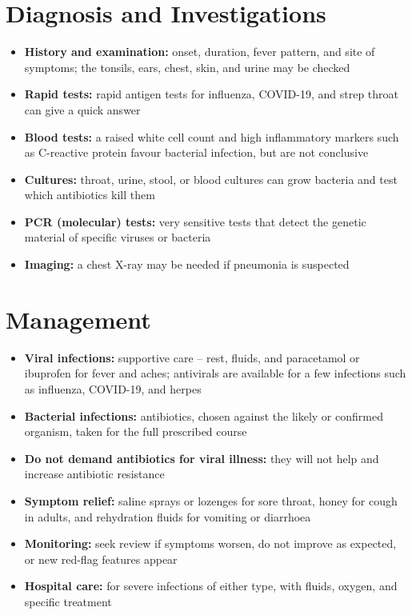 \section*{Diagnosis and Investigations}
\begin{itemize}
    \item \textbf{History and examination:} onset, duration, fever pattern, and site of symptoms; the tonsils, ears, chest, skin, and urine may be checked
    \item \textbf{Rapid tests:} rapid antigen tests for influenza, COVID-19, and strep throat can give a quick answer
    \item \textbf{Blood tests:} a raised white cell count and high inflammatory markers such as C-reactive protein favour bacterial infection, but are not conclusive
    \item \textbf{Cultures:} throat, urine, stool, or blood cultures can grow bacteria and test which antibiotics kill them
    \item \textbf{PCR (molecular) tests:} very sensitive tests that detect the genetic material of specific viruses or bacteria
    \item \textbf{Imaging:} a chest X-ray may be needed if pneumonia is suspected
\end{itemize}

\section*{Management}
\begin{itemize}
    \item \textbf{Viral infections:} supportive care -- rest, fluids, and paracetamol or ibuprofen for fever and aches; antivirals are available for a few infections such as influenza, COVID-19, and herpes
    \item \textbf{Bacterial infections:} antibiotics, chosen against the likely or confirmed organism, taken for the full prescribed course
    \item \textbf{Do not demand antibiotics for viral illness:} they will not help and increase antibiotic resistance
    \item \textbf{Symptom relief:} saline sprays or lozenges for sore throat, honey for cough in adults, and rehydration fluids for vomiting or diarrhoea
    \item \textbf{Monitoring:} seek review if symptoms worsen, do not improve as expected, or new red-flag features appear
    \item \textbf{Hospital care:} for severe infections of either type, with fluids, oxygen, and specific treatment
\end{itemize}

